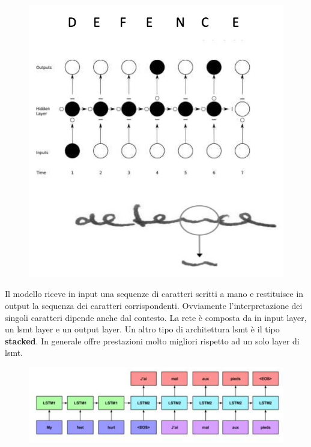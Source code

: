\begin{figure}[!h]
   \includegraphics[scale=.5]{images/rnn/real_app.png}
   \centering
\end{figure}


Il modello riceve in input una sequenze di caratteri scritti a mano e 
restituisce in output la sequenza dei caratteri corrispondenti. 
Ovviamente l'interpretazione dei singoli caratteri dipende anche dal contesto. 
La rete è composta da in input layer, un lsmt layer e un output layer.
\newline
\newline
Un altro tipo di architettura lsmt è il tipo \textbf{stacked}. 
In generale offre prestazioni molto migliori rispetto ad un solo layer di lsmt.
\begin{figure}[!h]
   \includegraphics[scale=.5]{images/rnn/stack_lsmt.png}
   \centering
\end{figure}